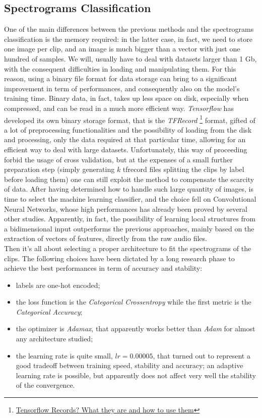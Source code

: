 \subsection{Spectrograms Classification}
\label{sec:spectrograms_classification}
One of the main differences between the previous methods and the spectrograms classification is the memory required: in the latter case, in fact, we need to store one image per clip, and an image is much bigger than a vector with just one hundred of samples. We will, usually have to deal with datasets larger than 1 Gb, with the consequent difficulties in loading and manipulating them. For this reason, using a binary file format for data storage can bring to a significant improvement in term of performances, and consequently also on the model's training time. Binary data, in fact, takes up less space on disk, especially when compressed, and can be read in a much more efficient way. \textit{Tensorflow} has developed its own binary storage format, that is the \textit{TFRecord} \footnote{\href{https://medium.com/mostly-ai/tensorflow-records-what-they-are-and-how-to-use-them-c46bc4bbb564}{Tensorflow Records? What they are and how to use them}} format, gifted of a lot of preprocessing functionalities and the possibility of loading from the disk and processing, only the data required at that particular time, allowing for an efficient way to deal with large datasets. Unfortunately, this way of proceeding forbid the usage of cross validation, but at the expenses of a small further preparation step (simply generating $k$ tfrecord files splitting the clips by label before loading them) one can still exploit the method to compensate the scarcity of data. After having determined how to handle such large quantity of images, is time to select the machine learning classifier, and the choice fell on Convolutional Neural Networks, whose high performances has already been proved by several other studies. Apparently, in fact, the possibility of learning local structures from a bidimensional input outperforms the previous approaches, mainly based on the extraction of vectors of features, directly from the raw audio files.\\
Then it's all about selecting a proper architecture to fit the spectrograms of the clips. The following choices have been dictated by a long research phase to achieve the best performances in term of accuracy and stability:
\begin{itemize}
	\itemsep0em
	\item labels are one-hot encoded;
	\item the loss function is the \textit{Categorical Crossentropy} while the first metric is the \textit{Categorical Accuracy};
	\item the optimizer is \textit{Adamax}, that apparently works better than \textit{Adam} for almost any architecture studied;
	\item the learning rate is quite small, $lr = 0.00005$, that turned out to represent a good tradeoff between training speed, stability and accuracy; an adaptive learning rate is possible, but apparently does not affect very well the stability of the convergence.
\end{itemize}
